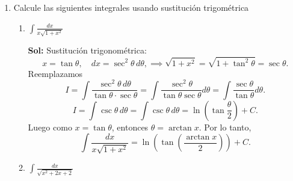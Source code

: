 \documentclass[letterpaper,12pt]{article}
\theoremstyle{plain}
\theoremstyle{definition}
\begin{document}
\begin{enumerate}
\begin{enumerate}
\item $\displaystyle \int \frac{1 + x + x^2}{x^3 - 8} \, dx$

\color{blue}
\textbf{Sol:} primero factorizando el denominador:
\[
x^3 - 8 = (x - 2)(x^2 + 2x + 4).
\]
Descomponemos en fracciones parciales:
\[
\frac{1 + x + x^2}{(x - 2)(x^2 + 2x + 4)} = \frac{A}{x - 2} + \frac{Bx + C}{x^2 + 2x + 4}.
\]
\[
1 + x + x^2 = A(x^2 + 2x + 4) + (Bx + C)(x - 2).
\]
\[
1 + x + x^2 = A x^2 + 2A x + 4A + B x^2 - 2 B x + C x - 2 C.
\]
\[
1 + x + x^2 = (A + B) x^2 + (2A - 2B + C) x + (4A - 2C).
\]
Igualamos coeficientes:
\[
\begin{cases}
A + B = 1 \\
2A - 2B + C = 1 \\
4A - 2C = 1
\end{cases}
\]
resolviendo, obtenemos:
\[
A=\frac{7}{12} \quad
C  = \frac{2}{3}
\quad
B = \frac{5}{12}.
\]
luego la descomposición es:
\[
\frac{1 + x + x^2}{x^3 - 8} = \frac{7/12}{x - 2} + \frac{(5/12) x + 2/3}{x^2 + 2x + 4}.
\]
\[
\int \frac{1 + x + x^2}{x^3 - 8} \, dx = \int \frac{7/12}{x - 2} \, dx + \int \frac{(5/12) x + 2/3}{x^2 + 2x + 4} \, dx.
\]
\[
= \frac{7}{12} \ln(x - 2) + \int \frac{(5/12) x + 2/3}{x^2 + 2x + 4} \, dx + C.
\]
Para la segunda integral, completamos el cuadrado en el denominador:
\[
x^2 + 2x + 4 = (x + 1)^2 + 3.
\]
Sea \( u = x + 1 \), entonces \( du = dx \) y \( x = u - 1 \), luego
\[
\int \frac{\frac{5}{12} u + \frac{1}{4}}{u^2 + 3} \, du = \frac{5}{12} \int \frac{u}{u^2 + 3} du + \frac{1}{4} \int \frac{1}{u^2 + 3} du.
\]
\[
\int \frac{(5/12) x + 2/3}{x^2 + 2x + 4} dx = \frac{5}{24} \ln(x^2 + 2x + 4) + \frac{1}{4\sqrt{3}} \arctan \left( \frac{x + 1}{\sqrt{3}} \right) + C.
\]
finalmente
$$
\int \frac{1 + x + x^2}{x^3 - 8} dx = \frac{7}{12} \ln(x - 2) + \frac{5}{24} \ln(x^2 + 2x + 4) + \frac{1}{4\sqrt{3}} \arctan \left( \frac{x + 1}{\sqrt{3}} \right) + C.
$$
\color{black}
\end{enumerate}

\item Calcule las siguientes integrales usando sustitución trigométrica
\begin{enumerate}
\item $\displaystyle \int \frac{dx}{x\sqrt{1+x^{2}}}$ 

\color{blue}
\textbf{Sol:} Sustitución trigonométrica:
\[
x = \tan \theta, \quad dx = \sec^2 \theta \, d\theta,
\implies 
\sqrt{1 + x^2} = \sqrt{1 + \tan^2 \theta} = \sec \theta.
\]
Reemplazamos
\[
I = \int \frac{\sec^2 \theta \, d\theta}{\tan \theta \cdot \sec \theta} = \int \frac{\sec^2 \theta}{\tan \theta \sec \theta} d\theta = \int \frac{\sec \theta}{\tan \theta} d\theta.
\]
\[
I = \int \csc \theta \, d\theta
=
\int \csc \theta \, d\theta = \ln \left( \tan \frac{\theta}{2} \right) + C.
\]
Luego como \( x = \tan \theta \), entonces $\theta = \arctan x.$ Por lo tanto,
\[
\int \frac{dx}{x \sqrt{1 + x^2}} = \ln \left( \tan \left( \frac{\arctan x}{2} \right) \right) + C.
\]
\color{black}
\item $\displaystyle \int \frac{dx}{\sqrt{x^2 + 2x + 2}}$


\end{enumerate}
\end{enumerate}
\end{document}
